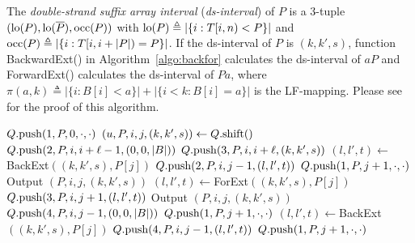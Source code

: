 \documentclass[webpdf,contemporary,large,namedate]{oup-authoring-template}%
\begin{document}
The \emph{double-strand suffix array interval} (\emph{ds-interval}) of $P$
is a 3-tuple $({\rm lo}(P),{\rm lo}(\overline{P}),{\rm occ}(P))$ with
${\rm lo}(P)\triangleq|\{i:T[i,n)<P\}|$ and ${\rm occ}(P)\triangleq|\{i:T[i,i+|P|)=P\}|$.
If the ds-interval of $P$ is $(k,k',s)$,
function {\sc BackwardExt()} in Algorithm~\ref{algo:backfor} calculates the ds-interval of $aP$
and {\sc ForwardExt()} calculates the ds-interval of $Pa$,
where $\pi(a,k)\triangleq |\{i:B[i]<a\}|+|\{i<k:B[i]=a\}|$ is the LF-mapping.
Please see \citet{Li:2024ac} for the proof of this algorithm.

\begin{algorithm}[tb]
	\caption{Find $(\ell,c)$-SMEMs in string set $\mathcal{P}$}\label{algo:smem}
	\begin{algorithmic}[1]
				\State $Q.{\rm push}(1,P,0,\cdot,\cdot)$
			\EndFor
				\State $(u,P,i,j,(k,k',s))\gets Q.{\rm shift}()$
					\State $Q.{\rm push}(2,P,i,i+\ell-1,(0,0,|B|))$
						\State $Q.{\rm push}(3,P,i,i+\ell,(k,k',s))$
					\Else
						\State $(l,l',t)\gets${\sc BackExt}$((k,k',s),P[j])$
							\State $Q.{\rm push}(2,P,i,j-1,(l,l',t))$
						\Else{}
							\State $Q.{\rm push}(1,P,j+1,\cdot,\cdot)$
						\EndIf
					\EndIf
						\State Output $(P,i,j,(k,k',s))$
					\EndIf
					\State $(l,l',t)\gets${\sc ForExt}$((k,k',s),P[j])$
						\State $Q.{\rm push}(3,P,i,j+1,(l,l',t))$
					\Else{}
						\State Output $(P,i,j,(k,k',s))$
						\State $Q.{\rm push}(4,P,i,j-1,(0,0,|B|))$
					\EndIf
						\State $Q.{\rm push}(1,P,j+1,\cdot,\cdot)$
					\Else
						\State $(l,l',t)\gets${\sc BackExt}$((k,k',s),P[j])$
							\State $Q.{\rm push}(4,P,i,j-1,(l,l',t))$
						\Else{}
							\State $Q.{\rm push}(1,P,j+1,\cdot,\cdot)$
						\EndIf
					\EndIf
				\EndIf
			\EndWhile
		\EndProcedure
	\end{algorithmic}
\end{algorithm}
\end{document}
